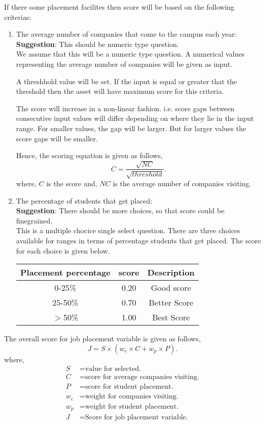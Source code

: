 \documentclass[oneside,twocolumn]{article}
\begin{document}
If there some placement facilites then score will be based on
the following criterias:
\begin{enumerate}
  \item The average number of companies that come to the
  campus each year: \\
  \textbf{Suggestion}: This should be numeric type question. \\

  We assume that this will be a numeric type question. A numerical
  values representing the average number of companies will be
  given as input.

  A threshhold value will be set. If the input is equal or greater
  that the threshold then the asset will have maximum score
  for this criteria. 

  The score will increase in a non-linear fashion. i.e. score
  gaps between consecutive input values will differ depending
  on where they lie in the input range. For smaller values, the
  gap will be larger. But for larger values the score gaps will
  be smaller.

  Hence, the scoring equation is given as follows,
  \[
	C = \dfrac{\sqrt{NC}}{\sqrt{threshold}}.
  \]
  where, \(C\) is the score and, \(NC\) is the average number of companies
  visiting.

  \item The percentage of students that get placed: \\
  \textbf{Suggestion}: There should be more choices, so that
  score could be finegrained. \\  

  This is a multiple chocice single select question. There are
  three choices available for ranges in terms of percentage
  students that get placed. The score for each choice is given
  below.
  \begin{center}
    \begin{tabular}{c | c | c} \hline
      Placement percentage & score & Description \\ \hline
      0-25\%		     & 0.20  & Good score \\
      25-50\%		     & 0.70  & Better Score \\
      \(>\)50\%	             & 1.00  & Best Score \\ \hline
    \end{tabular}
  \end{center}
  \end{enumerate}

The overall score for job placement variable is given as follows,
\[
	J = S \times (w_c \times C + w_p \times P).
\]
where,
\begin{align*}
	S &= \text{value for selected.} \\
	C &= \text{score for average companies visiting.} \\
	P &= \text{score for student placement.} \\
	w_c &= \text{weight for companies visiting.} \\
	w_p &= \text{weight for student placement.} \\
	J &= \text{Score for job placement variable.}
\end{align*}
\end{document}
